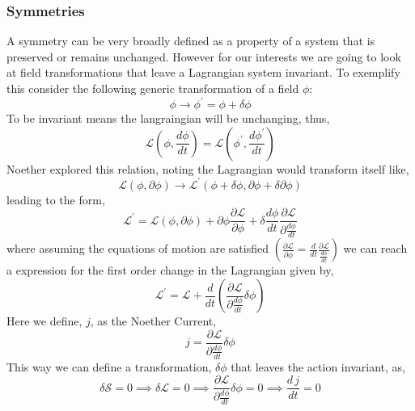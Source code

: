 \subsubsection{Symmetries }


A symmetry can be very broadly defined as a property of a system that is preserved or remains unchanged. However for our interests we are going to look at field transformations that leave a Lagrangian system invariant. To exemplify this consider the following generic transformation of a field $\phi$:
\begin{equation}
\phi \longrightarrow \phi^\prime = \phi + \delta \phi 
\end{equation} 
To be invariant means the langraingian will be unchanging, thus, 
\begin{equation}
\mathcal{L}(\phi , \frac{d \phi}{dt}  )  = \mathcal{L}(\phi^\prime , \frac{d \phi^\prime }{dt}  )
\end{equation}
Noether explored this relation, noting the Lagrangian would transform itself like, 
\begin{equation}
\mathcal{L}(\phi, \partial \phi) \longrightarrow \mathcal{L^\prime} (\phi+\delta \phi , \partial \phi + \delta \partial \phi )  
\end{equation}
leading to the form,
\begin{equation}
\mathcal{L}^\prime  = \mathcal{L}(\phi , \partial \phi ) 
+ \partial \phi \frac{\partial \mathcal{L}}{\partial\phi} 
+  \delta \frac{d\phi }{dt} \frac{\partial \mathcal{L}}{ \partial \frac{d\phi}{dt} }
\end{equation}
where assuming the equations of motion are satisfied $\left( \frac{ \partial \mathcal{L}}{\partial \phi}  = \frac{d}{dt} \frac{ \partial \mathcal{L}}{\frac{d \phi}{d t}} \right)$ we can reach a expression for the first order change in the Lagrangian given by, 
\begin{equation}
\mathcal{L}^\prime = \mathcal{L} + \frac{d}{dt} \left( \frac{ \partial \mathcal{L}}{ \partial \frac{d \phi}{dt}} \delta \phi \right) 
\end{equation}
Here we define, $j$, as the Noether Current, 
\begin{equation}
j= \frac{ \partial \mathcal{L}}{ \partial \frac{d \phi}{dt}} \delta \phi  
\end{equation}
This way we can define a transformation, $\delta \phi$ that leaves the action invariant, as, 
\begin{equation}
\delta \mathcal{S} = 0 \implies \delta \mathcal{L} = 0 \implies \frac{ \partial \mathcal{L}}{ \partial \frac{d \phi}{dt}} \delta \phi  = 0 \implies \frac{d \, j}{dt} = 0
\end{equation}
